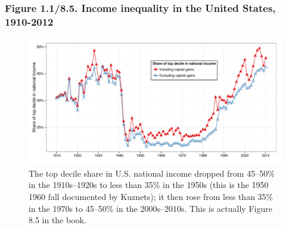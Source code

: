\documentclass[t]{beamer}\usepackage[]{graphicx}\usepackage[]{color}
\newenvironment{knitrout}{}{} %
\begin{document}
\begin{frame}[label=Figure_8_5,fragile]
\frametitle{Figure 1.1/8.5. Income inequality in the United States, 1910-2012}
\begin{figure}[t]
\begin{minipage}[b]{\textwidth}
\centering
\begin{knitrout}\footnotesize
{}\color{fgcolor}

{\centering \includegraphics[width=1\linewidth]{figures/color/Figure_8_5} 

}



\end{knitrout}
\caption{The top decile share in U.S. national income dropped from 45--50\% in the 1910s--1920s to less than 35\% in the 1950s (this is the
1950 1960 fall documented by Kuznets); it then rose from less than 35\% in the 1970s to 45--50\% in the 2000s--2010s. This is actually Figure 8.5 in the book.}
\end{minipage}
\end{figure}
\end{frame}
\end{document}
